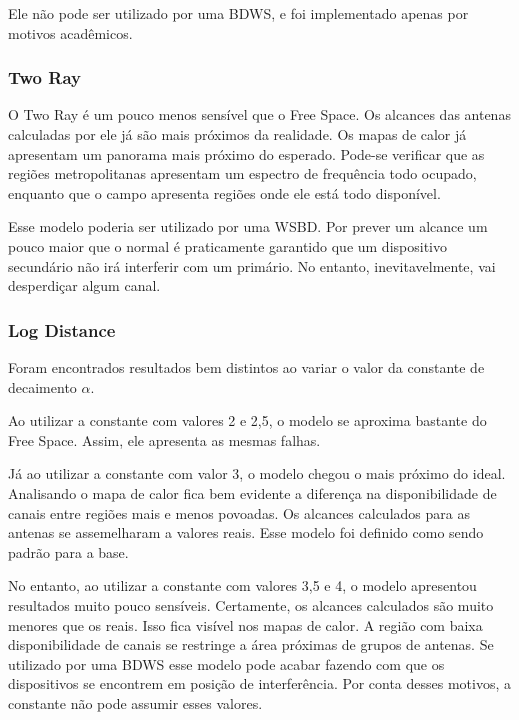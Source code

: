  Ele não pode ser utilizado por uma BDWS, e foi implementado apenas por motivos acadêmicos.

\subsubsection{Two Ray}

O Two Ray é um pouco menos sensível que o Free Space. Os alcances das antenas calculadas por ele já são mais próximos da realidade. Os mapas de calor já apresentam um panorama mais próximo do esperado. Pode-se verificar que as regiões metropolitanas apresentam um espectro de frequência todo ocupado, enquanto que o campo apresenta regiões onde ele está todo disponível.

Esse modelo poderia ser utilizado por uma WSBD. Por prever um alcance um pouco maior que o normal é praticamente garantido que um dispositivo secundário não irá interferir com um primário. No entanto, inevitavelmente, vai desperdiçar algum canal.

\subsubsection{Log Distance}

Foram encontrados resultados bem distintos ao variar o valor da constante de decaimento \begin{math}\alpha \end{math}.

Ao utilizar a constante com valores 2 e 2,5, o modelo se aproxima bastante do Free Space. Assim, ele apresenta as mesmas falhas.

Já ao utilizar a constante com valor 3, o modelo chegou o mais próximo do ideal. Analisando o mapa de calor fica bem evidente a diferença na disponibilidade de canais entre regiões mais e menos povoadas. Os alcances calculados para as antenas se assemelharam a valores reais. Esse modelo foi definido como sendo padrão para a base.

No entanto, ao utilizar a constante com valores 3,5 e 4, o modelo apresentou resultados muito pouco sensíveis. Certamente, os alcances calculados são muito menores que os reais. Isso fica visível nos mapas de calor. A região com baixa disponibilidade de canais se restringe a área próximas de grupos de antenas. Se utilizado por uma BDWS esse modelo pode acabar fazendo com que os dispositivos se encontrem em posição de interferência. Por conta desses motivos, a constante não pode assumir esses valores.

